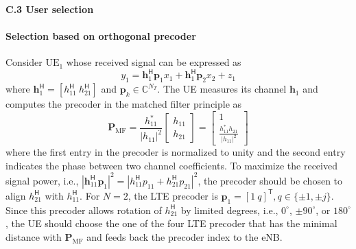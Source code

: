 \documentclass[a4paper,12pt]{article}%
\begin{document}

\noindent \textbf{C.3 User selection}

\paragraph{Selection based on orthogonal precoder}

Consider $\text{UE}_1$ whose received signal can be expressed as
\begin{equation}\label{eq:recv-signal-ue1}
y_{1} = \mathbf{h}^{\mathsf{H}}_{1} \mathbf{p}_{1} x_{1} + \mathbf{h}^{\mathsf{H}}_{1} \mathbf{p}_{2} x_{2} + z_{1}
\end{equation}
where $\bm{h}_{1}^{\mathsf{H}}=[h_{11}^{\mathsf{H}}~h_{21}^{\mathsf{H}}]$ and $\mathbf{p}_k \in \mathbb{C}^{N_T}$. The UE measures its channel $\mathbf{h}_1$ and computes the precoder in the matched filter principle as
\begin{equation}
\mathbf{P}_{\text{MF}} = \frac{h_{11}^*}{|h_{11}|^2} %
\begin{bmatrix} h_{11} \\ h_{21} \end{bmatrix} = \begin{bmatrix} 1 \\ \frac{ h_{11}^* h_{21} }{ |h_{11}|^2 } \end{bmatrix}
\end{equation}
where the first entry in the precoder is normalized to unity and the second entry indicates the phase between two channel coefficients. To maximize the received signal power, i.e., $|\mathbf{h}_{11}^{\mathsf{H}} \mathbf{p}_1|^2=|h_{11}^{\mathsf{H}} p_{11} + h_{21}^{\mathsf{H}} p_{21}|^2$, the precoder should be chosen to align $h_{21}^{\mathsf{H}}$ with $h_{11}^{\mathsf{H}}$. For $N=2$, the LTE precoder is $\mathbf{p}_1 = [1 ~q]^{\mathsf{T}}, q \in \{ \pm 1, \pm j \}$. Since this precoder allows rotation of $h_{21}^{\mathsf{H}}$ by limited degrees, i.e., $0^{\circ}$, $\pm 90^{\circ}$, or $180^{\circ}$, the UE should choose the one of the four LTE precoder that has the minimal distance with $\mathbf{P}_{\text{MF}}$ and feeds back the precoder index to the eNB.
\end{document}
